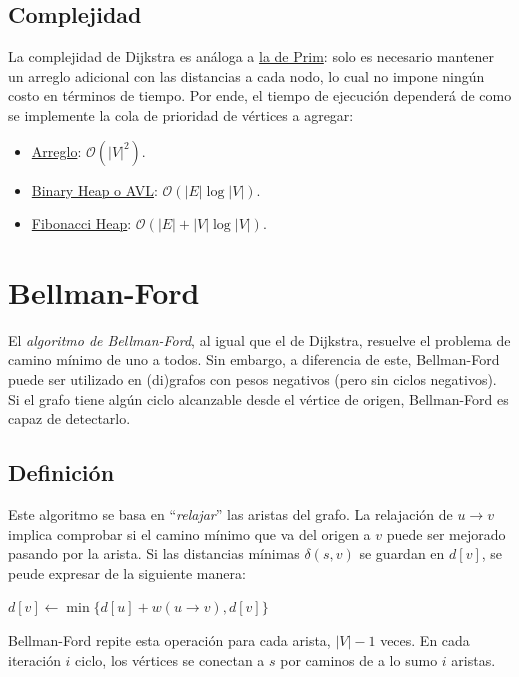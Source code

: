 \documentclass[a4paper]{report}
\newcommand{\BigO}[1]{\ensuremath{\mathcal{O}(#1)}}
\begin{document}
\subsection{Complejidad}

La complejidad de Dijkstra es análoga a \hyperref[complejidad-prim]{la de Prim}: solo es necesario mantener un arreglo adicional con las distancias a cada nodo, lo cual no impone ningún costo en términos de tiempo. Por ende, el tiempo de ejecución dependerá de como se implemente la cola de prioridad de vértices a agregar:
\begin{itemize}
    \item \underline{Arreglo}: \BigO{|V|^2}.
    \item \underline{Binary Heap o AVL}: \BigO{|E|\log{|V|}}.
    \item \underline{Fibonacci Heap}: \BigO{|E| + |V|\log{|V|}}.
\end{itemize}

\section{Bellman-Ford}

El \textit{algoritmo de Bellman-Ford}, al igual que el de Dijkstra, resuelve el problema de camino mínimo de uno a todos. Sin embargo, a diferencia de este, Bellman-Ford puede ser utilizado en (di)grafos con pesos negativos (pero sin ciclos negativos). Si el grafo tiene algún ciclo alcanzable desde el vértice de origen, Bellman-Ford es capaz de detectarlo.

\subsection{Definición}

Este algoritmo se basa en ``\textit{relajar}'' las aristas del grafo. La relajación de $u \rightarrow v$ implica comprobar si el camino mínimo que va del origen a $v$ puede ser mejorado pasando por la arista. Si las distancias mínimas $\delta(s, v)$ se guardan en $d[v]$, se peude expresar de la siguiente manera:

\begin{codebox}
    \li $d[v] \gets \min{\{d[u] + w(u \rightarrow v), d[v]\}}$
\end{codebox}

Bellman-Ford repite esta operación para cada arista, $|V| - 1$ veces. En cada iteración $i$ ciclo, los vértices se conectan a $s$ por caminos de a lo sumo $i$ aristas.
\end{document}
